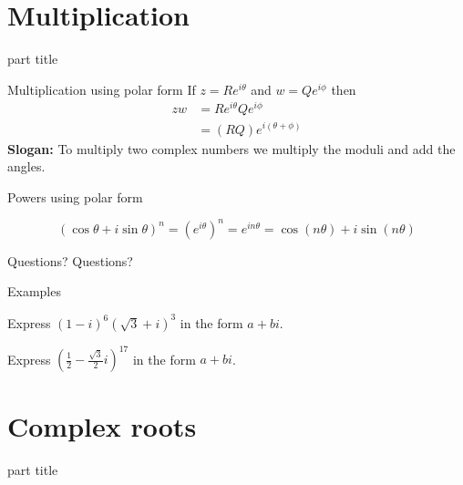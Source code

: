 \documentclass{beamer}
\begin{document}
\section{Multiplication}

\begin{frame}
\begin{beamercolorbox}[sep=12pt,center]{part title}
\insertsection\par
\end{beamercolorbox}
\end{frame}

\begin{frame}{Multiplication using polar form}
If $z=Re^{i\theta}$ and $w=Qe^{i\phi}$ then
\begin{align*}
zw&=Re^{i\theta}Qe^{i\phi}\\
 &= (RQ)e^{i(\theta+\phi)}
\end{align*}\vfill
{\bf Slogan:} To multiply two complex numbers we multiply the moduli and add the angles.\vfill
\end{frame}

\begin{frame}{Powers using polar form}
	\begin{theorem}
	\begin{equation*}
	(\cos\theta+i\sin\theta)^n = (e^{i\theta})^n = e^{in\theta} = \cos(n\theta)+i\sin(n\theta)
	\end{equation*}
	\end{theorem}
\end{frame}

\begin{frame}{Questions?}
Questions?
\end{frame}

\begin{frame}{Examples}
\begin{example}
Express $(1-i)^6(\sqrt{3}+i)^3$ in the form $a+bi$. %
\end{example}
\begin{example}
Express $(\frac{1}{2}-\frac{\sqrt{3}}{2}i)^{17}$ in the form $a+bi$. %
\end{example}
\end{frame}

\section{Complex roots}

\begin{frame}
\begin{beamercolorbox}[sep=12pt,center]{part title}
\insertsection\par
\end{beamercolorbox}
\end{frame}
\end{document}
